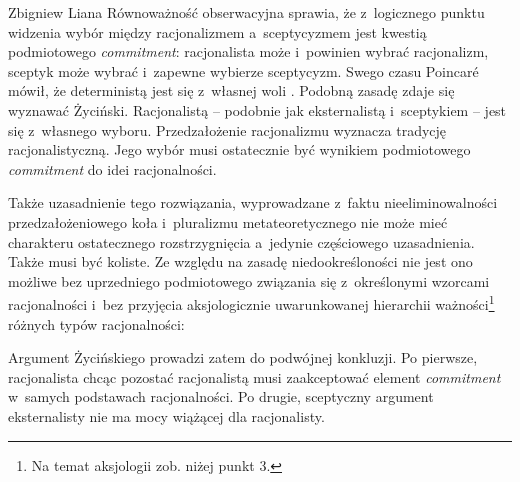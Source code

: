\begin{artplenv}{Zbigniew Liana}
Równoważność obserwacyjna sprawia, że z~logicznego punktu widzenia wybór między racjonalizmem a~sceptycyzmem jest kwestią podmiotowego \textit{commitment}: racjonalista może i~powinien wybrać racjonalizm, sceptyk może wybrać i~zapewne wybierze sceptycyzm. Swego czasu Poincaré
\parencite*[][]{poincare_valeur_1905} %
 mówił, że deterministą jest się z~własnej woli 
\parencite[][s.~276.278]{szumilewicz-lachman_poincare_1978}. %
 Podobną zasadę zdaje się wyznawać Życiński. Racjonalistą -- podobnie jak eksternalistą i~sceptykiem -- jest się z~własnego wyboru. Przedzałożenie racjonalizmu wyznacza tradycję racjonalistyczną. Jego wybór musi ostatecznie być wynikiem podmiotowego \textit{commitment} do idei racjonalności.

Także uzasadnienie tego rozwiązania, wyprowadzane z~faktu nieeliminowalności przedzałożeniowego koła i~pluralizmu metateoretycznego nie może mieć charakteru ostatecznego rozstrzygnięcia a~jedynie częściowego uzasadnienia. Także musi być koliste. Ze względu na zasadę niedookreśloności nie jest ono możliwe bez uprzedniego podmiotowego związania się z~określonymi wzorcami racjonalności i~bez przyjęcia aksjologicznie uwarunkowanej hierarchii ważności\footnote{Na temat aksjologii zob. niżej punkt 3.} różnych typów racjonalności:


\enlargethispage{-\baselineskip}
Argument Życińskiego prowadzi zatem do podwójnej konkluzji. Po pierwsze, racjonalista chcąc pozostać racjonalistą musi zaakceptować element \textit{commitment} w~samych podstawach racjonalności. Po drugie, sceptyczny argument eksternalisty nie ma mocy wiążącej dla racjonalisty.


\end{artplenv}
